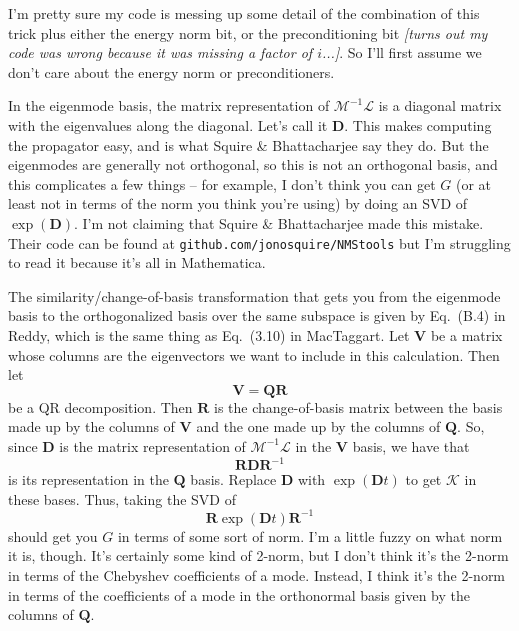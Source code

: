 \documentclass[aps,pop,preprint]{revtex4}
\begin{document}
I'm pretty sure my code is messing up some detail of the combination of this trick plus either the energy norm bit, or the preconditioning bit \textit{[turns out my code was wrong because it was missing a factor of $i$...]}. 
So I'll first assume we don't care about the energy norm or preconditioners.

In the eigenmode basis, the matrix representation of $\mathcal{M}^{-1}\mathcal{L}$ is a diagonal matrix with the eigenvalues along the diagonal. 
Let's call it $\mathbf{D}$. 
This makes computing the propagator easy, and is what Squire \& Bhattacharjee say they do. 
But the eigenmodes are generally not orthogonal, so this is not an orthogonal basis, and this complicates a few things -- for example, I don't think you can get $G$ (or at least not in terms of the norm you think you're using) by doing an SVD of $\exp(\mathbf{D})$. 
I'm not claiming that Squire \& Bhattacharjee made this mistake. 
Their code can be found at \texttt{github.com/jonosquire/NMStools} but I'm struggling to read it because it's all in Mathematica.

The similarity/change-of-basis transformation that gets you from the eigenmode basis to the orthogonalized basis over the same subspace is given by Eq.~(B.4) in Reddy, which is the same thing as Eq.~(3.10) in MacTaggart. 
Let $\mathbf{V}$ be a matrix whose columns are the eigenvectors we want to include in this calculation. 
Then let
\begin{equation}
\mathbf{V} = \mathbf{QR}
\end{equation}
be a QR decomposition. 
Then $\mathbf{R}$ is the change-of-basis matrix between the basis made up by the columns of $\mathbf{V}$ and the one made up by the columns of $\mathbf{Q}$. 
So, since $\mathbf{D}$ is the matrix representation of $\mathcal{M}^{-1}\mathcal{L}$ in the $\mathbf{V}$ basis, we have that
\begin{equation}
\mathbf{R} \mathbf{D} \mathbf{R}^{-1}
\end{equation}
is its representation in the $\mathbf{Q}$ basis. 
Replace $\mathbf{D}$ with $\exp(\mathbf{D} t)$ to get $\mathcal{K}$ in these bases. 
Thus, taking the SVD of
\begin{equation}
\mathbf{R} \exp(\mathbf{D} t) \mathbf{R}^{-1}
\end{equation}
should get you $G$ in terms of some sort of norm. 
I'm a little fuzzy on what norm it is, though. 
It's certainly some kind of 2-norm, but I don't think it's the 2-norm in terms of the Chebyshev coefficients of a mode. 
Instead, I think it's the 2-norm in terms of the coefficients of a mode in the orthonormal basis given by the columns of $\mathbf{Q}$.
\end{document}
